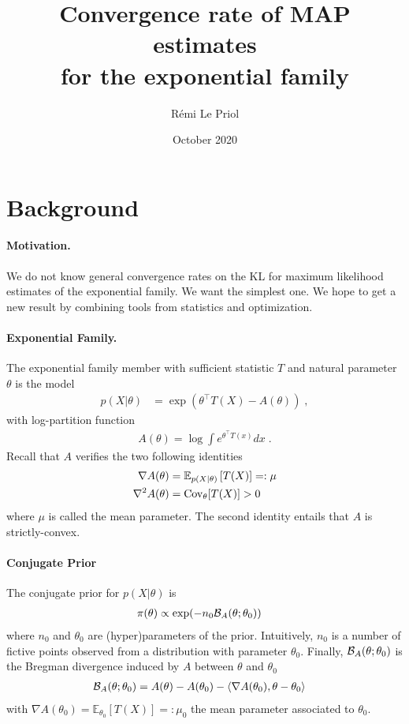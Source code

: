 \documentclass{article}
\title{Convergence rate of MAP estimates \\
for the exponential family}
\author{R\'emi Le Priol}
\date{October 2020}
\newcommand*{\expect}[2][]{\ensuremath{\mathbb{E}_{#1} \left[ #2 \right] }} %
\newcommand{\logpart}{A}
\newcommand{\bregman}{\cB_\logpart}
\newcommand{\natp}{\theta}
\newcommand{\meanp}{\mu}
\begin{document}
\maketitle

\section{Background}

\paragraph{Motivation.} 
We do not know general convergence rates on the KL for maximum likelihood estimates of the exponential family.  We want the simplest one.
We hope  to get a new result by combining tools from statistics and optimization. 

\paragraph{Exponential Family.}
The exponential family member with sufficient statistic $T$ and natural parameter $\natp$ is the model
\begin{align}
    p(X|\natp) &= \exp( \natp^\top T(X) - \logpart(\natp)) \; ,
\end{align}
with log-partition function 
\begin{align}
    \logpart(\natp) = \log \int e^{\natp^\top T(x)} dx \; .
\end{align}
Recall that $\logpart$ verifies the two following identities 
\begin{align}
    \nabla\logpart(\natp) &=  \expect[p(X|\natp)]{T(X)} =: \meanp \\
    \nabla^2 \logpart(\natp) &= \Cov_\natp[T(X)] > 0
\end{align}
where $\meanp$ is called the mean parameter.
The second identity entails that $\logpart$ is strictly-convex.

\paragraph{Conjugate Prior}
The conjugate prior for $p(X|\natp)$ is
\begin{align}
    \pi(\natp) &\propto \exp( - n_0 \bregman(\natp ; \natp_0) )
\end{align}
where $n_0$ and $\natp_0$ are (hyper)parameters of the prior.
Intuitively, $n_0$ is a number of fictive points observed from a distribution with parameter $\natp_0$.
Finally, $\bregman(\natp ; \natp_0)$ is the Bregman divergence induced by $\logpart$ between $\natp$ and $\natp_0$
\begin{align}
    \bregman (\natp ; \natp_0)
    & = \logpart(\natp) - \logpart(\natp_0) 
    - \langle \nabla \logpart(\natp_0)  , \natp - \natp_0 \rangle
\end{align}
with $\nabla \logpart(\natp_0) = \expect[\natp_0]{T(X)} =: \meanp_0$ the mean parameter associated to $\natp_0$.
\end{document}
